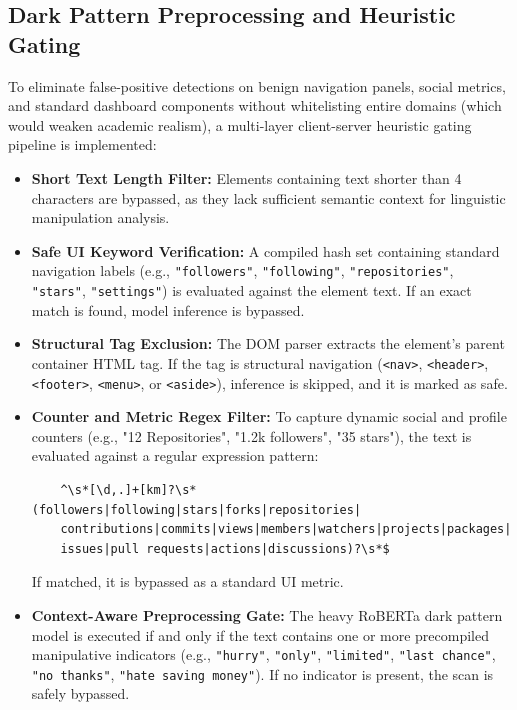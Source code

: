 \subsection{Dark Pattern Preprocessing and Heuristic Gating}
To eliminate false-positive detections on benign navigation panels, social metrics, and standard dashboard components without whitelisting entire domains (which would weaken academic realism), a multi-layer client-server heuristic gating pipeline is implemented:
\begin{itemize}
    \item \textbf{Short Text Length Filter:} Elements containing text shorter than 4 characters are bypassed, as they lack sufficient semantic context for linguistic manipulation analysis.
    \item \textbf{Safe UI Keyword Verification:} A compiled hash set containing standard navigation labels (e.g., \texttt{"followers"}, \texttt{"following"}, \texttt{"repositories"}, \texttt{"stars"}, \texttt{"settings"}) is evaluated against the element text. If an exact match is found, model inference is bypassed.
    \item \textbf{Structural Tag Exclusion:} The DOM parser extracts the element's parent container HTML tag. If the tag is structural navigation (\texttt{<nav>}, \texttt{<header>}, \texttt{<footer>}, \texttt{<menu>}, or \texttt{<aside>}), inference is skipped, and it is marked as safe.
    \item \textbf{Counter and Metric Regex Filter:} To capture dynamic social and profile counters (e.g., "12 Repositories", "1.2k followers", "35 stars"), the text is evaluated against a regular expression pattern:
    \begin{verbatim}
    ^\s*[\d,.]+[km]?\s*(followers|following|stars|forks|repositories|
    contributions|commits|views|members|watchers|projects|packages|
    issues|pull requests|actions|discussions)?\s*$
    \end{verbatim}
    If matched, it is bypassed as a standard UI metric.
    \item \textbf{Context-Aware Preprocessing Gate:} The heavy RoBERTa dark pattern model is executed if and only if the text contains one or more precompiled manipulative indicators (e.g., \texttt{"hurry"}, \texttt{"only"}, \texttt{"limited"}, \texttt{"last chance"}, \texttt{"no thanks"}, \texttt{"hate saving money"}). If no indicator is present, the scan is safely bypassed.
\end{itemize}

